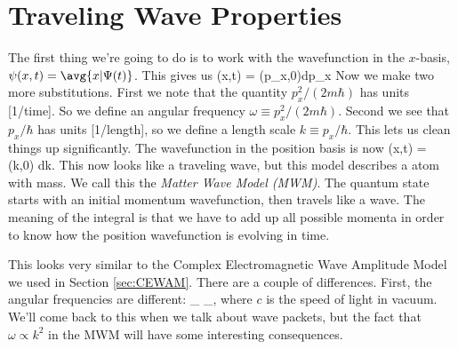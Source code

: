 \section{Traveling Wave Properties}
The first thing we're going to do is to work with the wavefunction in the $x$-basis, $\psi(x,t) = \avg{x|\Psi(t)}$. This gives us
\beq
\psi(x,t) =   \intii{}\phi(p_x,0)\;dp_x
\eeq
Now we make two more substitutions. First we note that the quantity $p_x^2/(2m\hbar)$ has units [1/time]. So we define an angular frequency $\omega \equiv p_x^2/(2m\hbar)$. Second we see that $p_x/\hbar$ has units [1/length], so we define a length scale $k\equiv p_x/\hbar$. This lets us clean things up significantly. The wavefunction in the position basis is now 
\beq
\psi(x,t) = \sqrt{\frac{\hbar}{2\pi}}  \intii\phi(\hbar k,0) dk.
\label{eq:tdsefreesolint}
\eeq
This now looks like a traveling wave, but this model describes a atom with mass. We call this the {\em Matter Wave Model (MWM)}. The quantum state starts with an initial momentum wavefunction, then travels like a wave. The meaning of the integral is that we have to add up all possible momenta in order to know how the position wavefunction is evolving in time. 

This looks very similar to the Complex Electromagnetic Wave Amplitude Model we used in Section \ref{sec:CEWAM}. There are a couple of differences. First, the angular frequencies are different:
\beq
{}_{\displaystyle {}} \quad \longleftrightarrow \quad {}_{\displaystyle {}},
\eeq
where $c$ is the speed of light in vacuum. We'll come back to this when we talk about wave packets, but the fact that  $\omega\propto k^2$ in the MWM will have some interesting consequences. 

